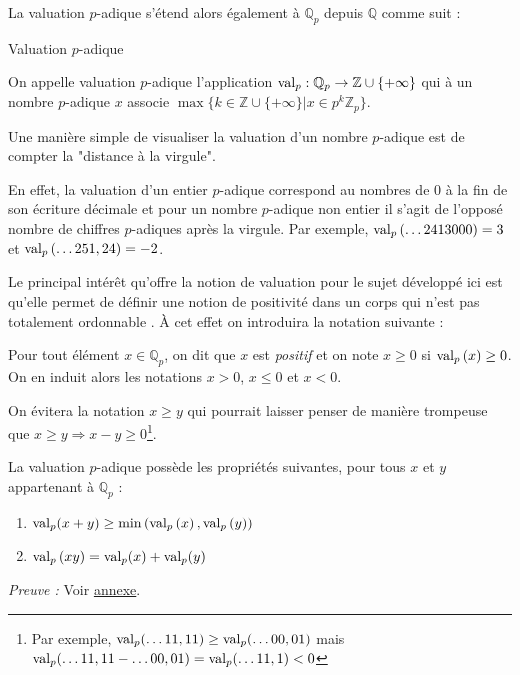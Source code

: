 La valuation $p$-adique s'étend alors également à $\mathbb{Q}_p$ depuis $\mathbb{Q}$ comme suit :
\begin{definition} Valuation $p$-adique
  
	On appelle valuation $p$-adique l'application $\text{val}_p: \mathbb{Q}_p \to \mathbb{Z}\cup \{+\infty\}  $ qui à un nombre $p$-adique $x$ associe $\max \{k \in \mathbb{Z}\cup \{+\infty\}| x\in p^k \mathbb{Z}_p\}$. 
\end{definition}
Une manière simple de visualiser la valuation d'un nombre $p$-adique est de compter la "distance à la virgule".

En effet, la valuation d'un entier $p$-adique correspond au nombres de $0$ à la fin de son écriture décimale et pour un nombre $p$-adique non entier il s'agit de l'opposé nombre de chiffres $p$-adiques après la virgule. Par exemple, $\text{val}_p\left( \ldots 2413000 \right) = 3$ et $\text{val}_p\left( \ldots 251,24 \right) = -2$.       

Le principal intérêt qu'offre la notion de valuation pour le sujet développé ici est qu'elle permet de définir une notion de positivité dans un corps qui n'est pas totalement ordonnable . À cet effet on introduira la notation suivante :
\begin{notation}
	  
	Pour tout élément $x \in \mathbb{Q}_{p} $, on dit que $x$ est \hypertarget{positif}{\textit{positif}} et on note $x\ge 0$ si $\text{val}_p\left(x\right)\ge 0$. On en induit alors les notations $x> 0$, $x\le 0$ et $x<0$.  
\end{notation}

        On évitera la notation $x\ge y$ qui pourrait laisser penser de manière trompeuse que $x\ge y \Rightarrow x-y\ge 0$\footnote{Par exemple, $\text{val}_p(\ldots11,11) \ge \text{val}_p(\ldots00,01) $ mais $\text{val}_p(\ldots11,11 - \ldots00,01) = \text{val}_p( \ldots 11,1) < 0$}.

\begin{propriete}
	La valuation $p$-adique possède les propriétés suivantes, pour tous $x$ et $y$ appartenant à $\mathbb{Q}_{p} $ :   
	\begin{enumerate}
		\label{propval} 
		\item $\text{val}_p(x+y) \ge \min\left( \text{val}_p\left( x \right), \text{val}_p\left( y \right)  \right) $ 
		\item $\text{val}_p\left( xy \right) = \text{val}_p (x) + \text{val}_p( y)$ 
	\end{enumerate}
\end{propriete}
\textit{Preuve :} Voir \hyperlink{propvalpreuve}{annexe}.   

